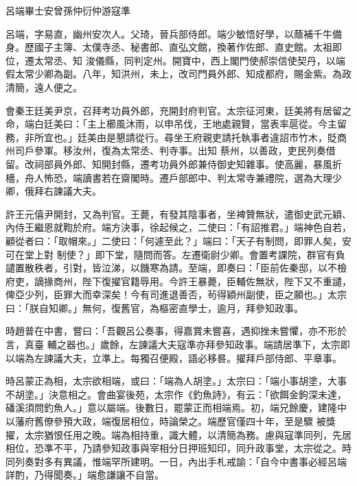 
\begin{pinyinscope}

 呂端畢士安曾孫仲衍仲游寇準



 呂端，字易直，幽州安次人。父琦，晉兵部侍郎。端少敏悟好學，以蔭補千牛備身。歷國子主簿、太僕寺丞、秘書郎、直弘文館，換著作佐郎、直史館。太祖即位，遷太常丞、知
 浚儀縣，同判定州。開寶中，西上閣門使郝崇信使契丹，以端假太常少卿為副。八年，知洪州，未上，改司門員外郎、知成都府，賜金紫。為政清簡，遠人便之。



 會秦王廷美尹京，召拜考功員外郎，充開封府判官。太宗征河東，廷美將有居留之命，端白廷美曰：「主上櫛風沐雨，以申吊伐，王地處親賢，當表率扈從。今主留務，非所宜也。」廷美由是懇請從行。尋坐王府親吏請托執事者違詔市竹木，貶商州司戶參軍。移汝州，復為太常丞、判寺事。出知
 蔡州，以善政，吏民列奏借留。改祠部員外郎、知開封縣，遷考功員外郎兼侍御史知雜事。使高麗，暴風折檣，舟人怖恐，端讀書若在齋閣時。遷戶部郎中、判太常寺兼禮院，選為大理少卿，俄拜右諫議大夫。



 許王元僖尹開封，又為判官。王薨，有發其陰事者，坐裨贊無狀，遣御史武元穎、內侍王繼恩就鞫於府。端方決事，徐起候之，二使曰：「有詔推君。」端神色自若，顧從者曰：「取帽來。」二使曰：「何遽至此？」端曰：「天子有制問，即罪人矣，安可在堂上對
 制使？」即下堂，隨問而答。左遷衛尉少卿。會置考課院，群官有負譴置散秩者，引對，皆泣涕，以饑寒為請。至端，即奏曰：「臣前佐秦邸，以不檢府吏，謫掾商州，陛下復擢官籍辱用。今許王暴薨，臣輔佐無狀，陛下又不重譴，俾亞少列，臣罪大而幸深矣！今有司進退善否，茍得穎州副使，臣之願也。」太宗曰：「朕自知卿。」無何，復舊官，為樞密直學士，逾月，拜參知政事。



 時趙普在中書，嘗曰：「吾觀呂公奏事，得嘉賞未嘗喜，遇抑挫未嘗懼，亦不形於言，真臺
 輔之器也。」歲餘，左諫議大夫寇準亦拜參知政事。端請居準下，太宗即以端為左諫議大夫，立準上。每獨召便殿，語必移晷。擢拜戶部侍郎、平章事。



 時呂蒙正為相，太宗欲相端，或曰：「端為人胡塗。」太宗曰：「端小事胡塗，大事不胡塗。」決意相之。會曲宴後苑，太宗作《釣魚詩》，有云：「欲餌金鉤深未達，磻溪須問釣魚人。」意以屬端。後數日，罷蒙正而相端焉。初，端兄餘慶，建隆中以藩府舊僚參預大政，端復居相位，時論榮之。端歷官僅四十年，至是驟
 被獎擢，太宗猶恨任用之晚。端為相持重，識大體，以清簡為務。慮與寇準同列，先居相位，恐準不平，乃請參知政事與宰相分日押班知印，同升政事堂，太宗從之。時同列奏對多有異議，惟端罕所建明。一日，內出手札戒諭：「自今中書事必經呂端詳酌，乃得聞奏。」端愈謙讓不自當。




\end{pinyinscope}
